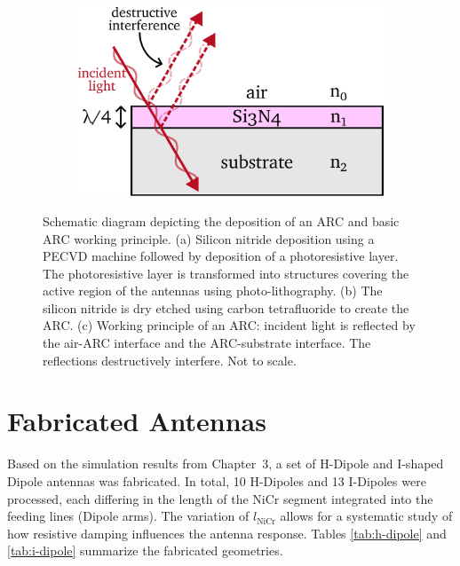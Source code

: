 \begin{figure}[!]
\begin{subfigure}[b]{0.21\textwidth}
        \caption{\centering}
        \label{fig:fabarc2}
    \end{subfigure}
    \hfill
    \begin{subfigure}[b]{0.45\textwidth}
        \centering
        \includegraphics[width=\textwidth]{figures/Fabrication/ARC.pdf}
        \caption{\centering}
        \label{fig:fabarc}
    \end{subfigure}
    \caption{Schematic diagram depicting the deposition of an ARC and basic ARC working principle. (a) Silicon nitride deposition using a PECVD machine followed by deposition of a photoresistive layer. The photoresistive layer is transformed into structures covering the active region of the antennas using photo-lithography. (b) The silicon nitride is dry etched using carbon tetrafluoride to create the ARC. (c) Working principle of an ARC: incident light is reflected by the air-ARC interface and the ARC-substrate interface. The reflections destructively interfere. Not to scale.}
\end{figure}

\section{Fabricated Antennas}

Based on the simulation results from Chapter~3, a set of H-Dipole and I-shaped Dipole antennas was
fabricated. In total, 10 H-Dipoles and 13 I-Dipoles were processed, each differing in the length of the NiCr segment integrated into the feeding lines (Dipole arms). The variation of $l_{\mathrm{NiCr}}$ allows for a systematic study of how resistive damping influences the antenna response. Tables \ref{tab:h-dipole} and \ref{tab:i-dipole} summarize the fabricated geometries.

